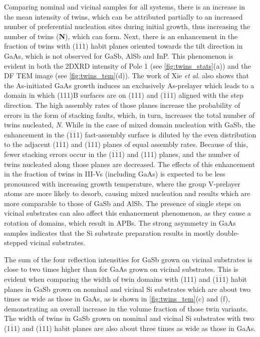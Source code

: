 Comparing nominal and vicinal samples for all systems, there is an increase in the mean intensity of twins, which can be attributed partially to an increased number of preferential nucleation sites during initial growth, thus increasing the number of twins (\textbf{N}), which can form. Next, there is an enhancement in the fraction of twins with ($\overline{1}\overline{1}$1) habit planes oriented towards the tilt direction in GaAs, which is not observed for GaSb, AlSb and InP. This phenomenon is evident in both the 2DXRD intensity of Pole 1 (see \cref{fig:twins_stats}(a)) and the DF TEM image (see \cref{fig:twins_tem}(d)). The work of Xie \textit{et al}. also shows that the As-initiated GaAs growth induces an exclusively As-prelayer which leads to a domain in which (111)B surfaces are on (111) and ($\overline{1}\overline{1}$1) aligned with the step direction. The high assembly rates of those planes increase the probability of errors in the form of stacking faults, which, in turn, increases the total number of twins nucleated, \textit{N}. While in the case of mixed domain nucleation with GaSb, the enhancement in the ($\overline{1}\overline{1}$1) fast-assembly surface is diluted by the even distribution to the adjacent (1$\overline{1}$1) and ($\overline{1}$11) planes of equal assembly rates. Because of this, fewer stacking errors occur in the ($\overline{1}\overline{1}$1) and (111) planes, and the number of twins nucleated along those planes are decreased. The effects of this enhancement in the fraction of twins in III-Vs (including GaAs) is expected to be less pronounced with increasing growth temperature, where the group V-prelayer atoms are more likely to desorb, causing mixed nucleation and results which are more comparable to those of GaSb and AlSb. The presence of single steps on vicinal substrates can also affect this enhancement phenomenon, as they cause a rotation of domains, which result in APBs. The strong asymmetry in GaAs samples indicates that the Si substrate preparation results in mostly double-stepped vicinal substrates.

The sum of the four reflection intensities for GaSb grown on vicinal substrates is close to two times higher than for GaAs grown on vicinal substrates. This is evident when comparing the width of twin domains with (111) and ($\overline{1}\overline{1}$1) habit planes in GaSb grown on nominal and vicinal Si substrates which are about two times as wide as those in GaAs, as is shown in \cref{fig:twins_tem}(c) and (f), demonstrating an overall increase in the volume fraction of those twin variants. The width of twins in GaSb grown on nominal and vicinal Si substrates with two (1$\overline{1}$1) and ($\overline{1}$11) habit planes are also about three times as wide as those in GaAs.

